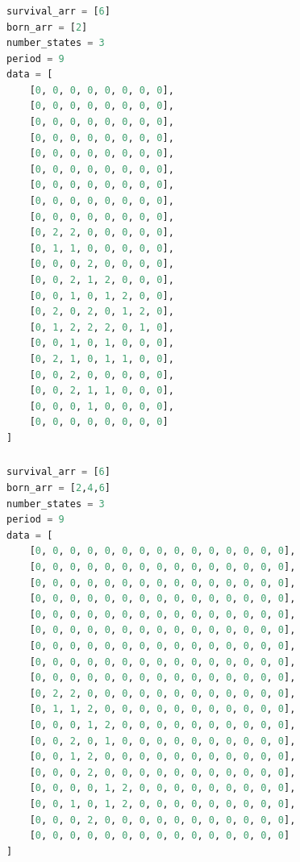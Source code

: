 \documentclass[12pt]{article}
\numberwithin{figure}{section} %
\begin{document}
\subsubsection{}
\begin{lstlisting}[language = Python]
survival_arr = [6]
born_arr = [2]
number_states = 3
period = 9
data = [
    [0, 0, 0, 0, 0, 0, 0, 0],
    [0, 0, 0, 0, 0, 0, 0, 0],
    [0, 0, 0, 0, 0, 0, 0, 0],
    [0, 0, 0, 0, 0, 0, 0, 0],
    [0, 0, 0, 0, 0, 0, 0, 0],
    [0, 0, 0, 0, 0, 0, 0, 0],
    [0, 0, 0, 0, 0, 0, 0, 0],
    [0, 0, 0, 0, 0, 0, 0, 0],
    [0, 0, 0, 0, 0, 0, 0, 0],
    [0, 2, 2, 0, 0, 0, 0, 0],
    [0, 1, 1, 0, 0, 0, 0, 0],
    [0, 0, 0, 2, 0, 0, 0, 0],
    [0, 0, 2, 1, 2, 0, 0, 0],
    [0, 0, 1, 0, 1, 2, 0, 0],
    [0, 2, 0, 2, 0, 1, 2, 0],
    [0, 1, 2, 2, 2, 0, 1, 0],
    [0, 0, 1, 0, 1, 0, 0, 0],
    [0, 2, 1, 0, 1, 1, 0, 0],
    [0, 0, 2, 0, 0, 0, 0, 0],
    [0, 0, 2, 1, 1, 0, 0, 0],
    [0, 0, 0, 1, 0, 0, 0, 0],
    [0, 0, 0, 0, 0, 0, 0, 0]
]
\end{lstlisting}
\subsubsection{}
\begin{lstlisting}[language = Python]
survival_arr = [6]
born_arr = [2,4,6]
number_states = 3
period = 9
data = [
    [0, 0, 0, 0, 0, 0, 0, 0, 0, 0, 0, 0, 0, 0, 0],
    [0, 0, 0, 0, 0, 0, 0, 0, 0, 0, 0, 0, 0, 0, 0],
    [0, 0, 0, 0, 0, 0, 0, 0, 0, 0, 0, 0, 0, 0, 0],
    [0, 0, 0, 0, 0, 0, 0, 0, 0, 0, 0, 0, 0, 0, 0],
    [0, 0, 0, 0, 0, 0, 0, 0, 0, 0, 0, 0, 0, 0, 0],
    [0, 0, 0, 0, 0, 0, 0, 0, 0, 0, 0, 0, 0, 0, 0],
    [0, 0, 0, 0, 0, 0, 0, 0, 0, 0, 0, 0, 0, 0, 0],
    [0, 0, 0, 0, 0, 0, 0, 0, 0, 0, 0, 0, 0, 0, 0],
    [0, 0, 0, 0, 0, 0, 0, 0, 0, 0, 0, 0, 0, 0, 0],
    [0, 2, 2, 0, 0, 0, 0, 0, 0, 0, 0, 0, 0, 0, 0],
    [0, 1, 1, 2, 0, 0, 0, 0, 0, 0, 0, 0, 0, 0, 0],
    [0, 0, 0, 1, 2, 0, 0, 0, 0, 0, 0, 0, 0, 0, 0],
    [0, 0, 2, 0, 1, 0, 0, 0, 0, 0, 0, 0, 0, 0, 0],
    [0, 0, 1, 2, 0, 0, 0, 0, 0, 0, 0, 0, 0, 0, 0],
    [0, 0, 0, 2, 0, 0, 0, 0, 0, 0, 0, 0, 0, 0, 0],
    [0, 0, 0, 0, 1, 2, 0, 0, 0, 0, 0, 0, 0, 0, 0],
    [0, 0, 1, 0, 1, 2, 0, 0, 0, 0, 0, 0, 0, 0, 0],
    [0, 0, 0, 2, 0, 0, 0, 0, 0, 0, 0, 0, 0, 0, 0],
    [0, 0, 0, 0, 0, 0, 0, 0, 0, 0, 0, 0, 0, 0, 0]
]
\end{lstlisting}
\end{document}
